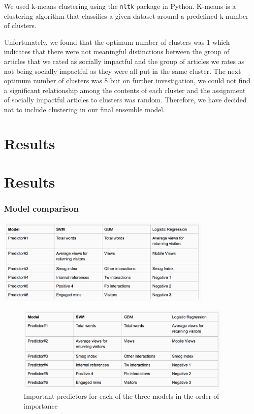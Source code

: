 \documentclass[10pt,letterpaper]{article}
\begin{document}
We used k-means clustering using the \texttt{nltk} package in Python.
K-means is a clustering algorithm that classifies a given dataset around
a predefined k number of clusters.

Unfortunately, we found that the optimum number of clusters was 1 which
indicates that there were not meaningful distinctions between the group
of articles that we rated as socially impactful and the group of
articles we rates as not being socially impactful as they were all put
in the same cluster. The next optimum number of clusters was 8 but on
further investigation, we could not find a significant relationship
among the contents of each cluster and the assignment of socially
impactful articles to clusters was random. Therefore, we have decided
not to include clustering in our final ensemble model.

\section{Results}\label{results}
\hypertarget{results}{%
\section{Results}\label{results}}

\subsubsection{Model comparison}\label{model-comparison}

\includegraphics[width=400px]{model-comp-II}

\begin{figure}
\includegraphics[width=400px]{model-comp-II} \caption{Important predictors for each of the three models in the order of importance}\label{fig:unnamed-chunk-7}
\end{figure}
\end{document}
